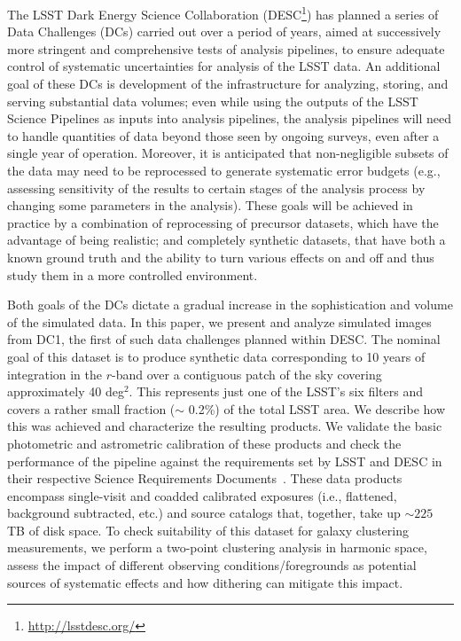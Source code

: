 \documentclass[\docopts]{\docclass}
\begin{document}
The LSST Dark Energy Science Collaboration
(DESC\footnote{\url{http://lsstdesc.org/}}) has planned a series of
Data Challenges (DCs) carried out over a period of years, aimed at
successively more stringent and comprehensive tests of analysis
pipelines, to ensure adequate control of systematic uncertainties for
analysis of the LSST data.  An additional goal of these DCs is
development of the infrastructure for analyzing, storing, and serving
substantial data volumes; even while using the outputs of the LSST
Science Pipelines as inputs into analysis pipelines, the
analysis pipelines will need to handle quantities of data beyond those
seen by ongoing surveys, even after a single year of operation. 
Moreover, it is anticipated that non-negligible subsets of
the data may need to be reprocessed to generate systematic error
budgets (e.g., assessing sensitivity of the results to certain stages
of the analysis process by changing some parameters in the
analysis). These goals will be achieved in practice by a combination
of reprocessing of precursor datasets, which have the advantage of
being realistic; and completely synthetic datasets, that have both a known ground 
truth and the ability to turn various effects on and off and thus study them in a more controlled environment.

Both goals of the DCs dictate a gradual increase in the
sophistication and volume of the simulated data. In this paper, we
present and analyze simulated images from DC1, the first of such
data challenges planned within DESC. The nominal goal of this dataset
is to produce synthetic data corresponding to 10 years of integration
in the $r$-band over a contiguous patch of the sky covering approximately 40 deg$^{2}$. 
This represents just one of the LSST's six filters and covers a rather 
small fraction ($\sim$ 0.2\%) of the total LSST area. We
describe how this was achieved and characterize the resulting
products. We validate the basic photometric and astrometric
calibration of these products and check the performance of the
pipeline against the requirements set by LSST and DESC in their
respective Science Requirements Documents~\citep{LPM-17,
  2018arXiv180901669T}. These data products encompass single-visit and
coadded calibrated exposures (i.e., flattened, background subtracted,
etc.) and source catalogs that, together, take up $\sim 225$ TB of disk
space. To check suitability of this dataset for galaxy clustering
measurements, we perform a two-point clustering analysis in harmonic space, 
assess the impact of different observing conditions/foregrounds as potential sources 
of systematic effects and how dithering can mitigate this impact. 
\end{document}
